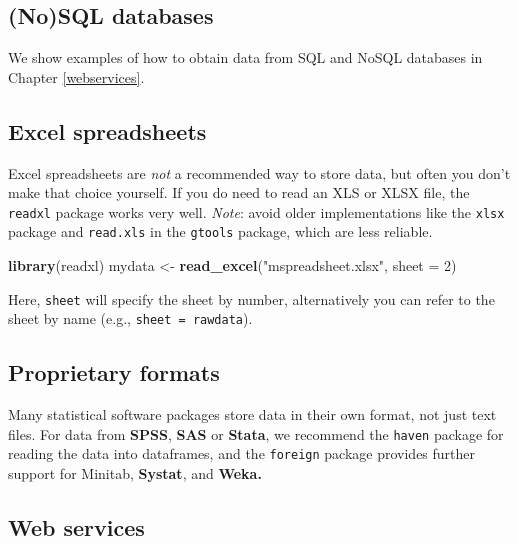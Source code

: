 \documentclass[]{book}
\newenvironment{Shaded}{\begin{snugshade}}{\end{snugshade}}
\newcommand{\DataTypeTok}[1]{\textcolor[rgb]{0.13,0.29,0.53}{#1}}
\newcommand{\DecValTok}[1]{\textcolor[rgb]{0.00,0.00,0.81}{#1}}
\newcommand{\KeywordTok}[1]{\textcolor[rgb]{0.13,0.29,0.53}{\textbf{#1}}}
\newcommand{\NormalTok}[1]{#1}
\newcommand{\StringTok}[1]{\textcolor[rgb]{0.31,0.60,0.02}{#1}}
\begin{document}
\hypertarget{nosql-databases}{%
\subsection{(No)SQL databases}\label{nosql-databases}}

We show examples of how to obtain data from SQL and NoSQL databases in Chapter \ref{webservices}.

\hypertarget{excel-spreadsheets}{%
\subsection{Excel spreadsheets}\label{excel-spreadsheets}}

Excel spreadsheets are \emph{not} a recommended way to store data, but often you don't make that choice yourself. If you do need to read an XLS or XLSX file, the \texttt{readxl} package works very well. \emph{Note}: avoid older implementations like the \texttt{xlsx} package and \texttt{read.xls} in the \texttt{gtools} package, which are less reliable.

\begin{Shaded}
\begin{Highlighting}[]
\KeywordTok{library}\NormalTok{(readxl)}
\NormalTok{mydata <-}\StringTok{ }\KeywordTok{read_excel}\NormalTok{(}\StringTok{"mspreadsheet.xlsx"}\NormalTok{, }\DataTypeTok{sheet =} \DecValTok{2}\NormalTok{)}
\end{Highlighting}
\end{Shaded}

Here, \texttt{sheet} will specify the sheet by number, alternatively you can refer to the sheet by name (e.g., \texttt{sheet\ =\ \textquotesingle{}rawdata\textquotesingle{}}).

\hypertarget{proprietary-formats}{%
\subsection{Proprietary formats}\label{proprietary-formats}}

Many statistical software packages store data in their own format, not just text files. For data from \textbf{SPSS}, \textbf{SAS} or \textbf{Stata}, we recommend the \texttt{haven} package for reading the data into dataframes, and the \texttt{foreign} package provides further support for Minitab, \textbf{Systat}, and \textbf{Weka.}

\hypertarget{web-services}{%
\subsection{Web services}\label{web-services}}
\end{document}

